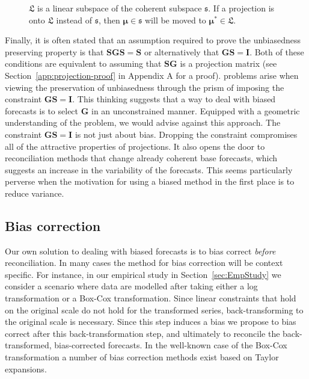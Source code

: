 \documentclass[12pt]{article}
\theoremstyle{definition}
\begin{document}
\begin{figure}[!hbt]
  \centering
  \vspace{-0.9cm}
  \small
  \resizebox{0.8\linewidth}{!}{
    
  }
  \caption{$\mathfrak{L}$ is a linear subspace of the coherent subspace $\mathfrak{s}$. If a projection is onto $\mathfrak{L}$ instead of $\mathfrak{s}$, then $\bm{\mu} \in \mathfrak{s}$ will be moved to $\bm{\mu}^* \in \mathfrak{L}$.}\label{fig:Schematic_3D}
\end{figure}

Finally, it is often stated that an assumption required to prove the unbiasedness preserving property is that $\bm{S}\bm{G}\bm{S}=\bm{S}$ or alternatively that $\bm{G}\bm{S}=\bm{I}$. Both of these conditions are equivalent to assuming that $\bm{S}\bm{G}$ is a projection matrix (see Section~\ref{app:projection-proof} in Appendix A for a proof). {\color{blue}{Despite this connection,}} problems arise when viewing the preservation of unbiasedness through the prism of imposing the constraint $\bm{G}\bm{S}=\bm{I}$. This thinking suggests that a way to deal with biased forecasts is to select $\bm{G}$ in an unconstrained manner. Equipped with a geometric understanding of the problem, we would advise against this approach. The constraint $\bm{G}\bm{S}=\bm{I}$ is not just about bias. Dropping the constraint compromises all of the attractive properties of projections. It also opens the door to reconciliation methods that change already coherent base forecasts, which suggests an increase in the variability of the forecasts. This seems particularly perverse when the motivation for using a biased method in the first place is to reduce variance.

\subsection{Bias correction}

Our own solution to dealing with biased forecasts is to bias correct \emph{before} reconciliation. In many cases the method for bias correction will be context specific. For instance, in our empirical study in Section~\ref{sec:EmpStudy} we consider a scenario where {\color{blue} data are modelled after} taking either a log transformation or a Box-Cox transformation. {\color{blue} Since linear constraints that hold on the original scale do not hold for the transformed series, back-transforming to the original scale is necessary.  Since this step induces a bias we propose to bias correct after this back-transformation step, and ultimately to reconcile the back-transformed, bias-corrected forecasts.}  In the well-known case {\color{blue} of the Box-Cox transformation} a number of bias correction methods exist based on Taylor expansions.
\end{document}
